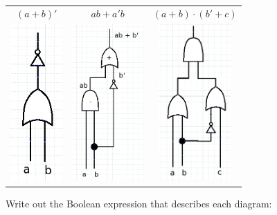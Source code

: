 \documentclass[a4paper,12pt]{book}
\newcounter{question}
\begin{document}
\begin{intro}{\ }
		\begin{center}
			\begin{tabular}{c c c}
				$(a+b)'$ &
				$ ab + a'b $ &
				$(a+b) \cdot (b' + c)$
				\\
				\includegraphics[height=6cm]{images/3-5-gate1.png} &
				\includegraphics[height=6cm]{images/3-5-gate2.png} &
				\includegraphics[height=6cm]{images/3-5-gate3.png} 
			\end{tabular}
		\end{center}
			
	\end{intro}
		
		\newpage
		
        \begin{questionNOGRADE}{\thequestion}
			
			Write out the Boolean expression that describes each diagram:
	
			
        \end{questionNOGRADE}
        
\end{document}
